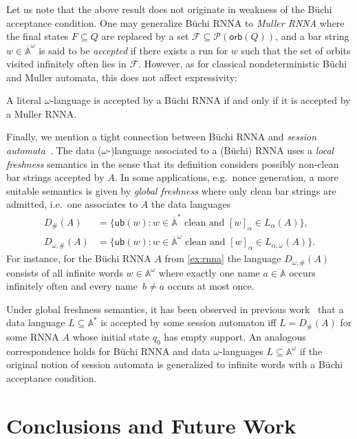 \documentclass[10pt,a4paper]{amsart}
\newcommand{\compr}{:}
\newcommand{\F}{\mathcal{F}}
\newcommand{\barA}{\overline{\names}}
\newcommand{\ub}{\mathsf{ub}}
\numberwithin{equation}{section}
\newcommand{\seq}{\subseteq}
\newcommand{\orb}{\mathsf{orb}}
\newcommand{\+}[1]{\mathcal{#1}\xspace}
\newcommand{\Pow}{\mathcal{P}}
\newcommand{\names}{\mathbb{A}}
\theoremstyle{definition}
\begin{document}
Let us note that the above result does not originate in weakness of the Büchi acceptance condition. One may generalize Büchi RNNA to \emph{Muller RNNA} where the final states $F\seq Q$ are replaced
by a set $\F\seq \Pow(\orb(Q))$, and a bar string $w\in \barA^\omega$ is said to be
\emph{accepted} if there exists a run for $w$ such
that the set of orbits visited infinitely often lies in $\F$. However, as for
classical nondeterministic Büchi and Muller automata, this does 
not affect expressivity:
%
\begin{proposition}\label{prop:muller-buchi-equiv}
  A literal $\omega$-language is accepted by a Büchi RNNA if and only
  if it is accepted by a Muller RNNA.
\end{proposition}
%
%
Finally, we mention a tight connection between Büchi RNNA and
\emph{session automata}~\cite{BolligEA14}. The data
($\omega$-)language associated to a (Büchi) RNNA uses a \emph{local
  freshness} semantics in the sense that its definition considers
possibly non-clean bar strings accepted by $A$. In some applications,
e.g.~nonce generation, a more suitable semantics is given by
\emph{global freshness} where only clean bar strings are admitted,
i.e.~one associates to $A$ the data languages
\begin{align*}
  D_{\#}(A)
  &= \{ \ub(w) \compr \text{$w\in \barA^*$ clean and $[w]_\alpha\in
    L_{\alpha}(A)$} \},
  \\
  D_{\omega,\#}(A)
  &= \{ \ub(w) \compr \text{$w\in \barA^\omega$ clean and $[w]_\alpha\in L_{\alpha,\omega}(A)$} \}. 
\end{align*}
For instance, for the Büchi RNNA $A$ from \autoref{ex:rnna} the
language $D_{\omega,\#}(A)$ consists of all infinite words
$w\in \names^\omega$ where exactly one name $a\in \names$ occurs
infinitely often and every name~$b\neq a$ occurs at most once.

Under global freshness semantics, it has been observed in previous
work~\cite{SchroderEA17} that a data language $L\seq \names^*$ is
accepted by some session automaton iff $L=D_{\#}(A)$ for some RNNA $A$
whose initial state $q_0$ has empty support. An analogous correspondence holds for Büchi
RNNA and data $\omega$-languages $L\seq \names^\omega$ if the original
notion of session automata is generalized to infinite words with a
Büchi acceptance condition.
\section{Conclusions and Future Work}
\end{document}
